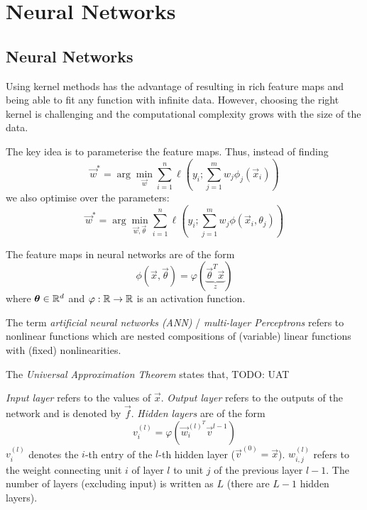\chapter{Neural Networks}


\section{Neural Networks}
Using kernel methods has the advantage of resulting in rich
feature maps and being able to fit any function with infinite data.
However, choosing the right kernel is challenging and the
computational complexity grows with the size of the data.

The key idea is to parameterise the feature maps.
Thus, instead of finding
\begin{equation*}
\vec{w}^* = \arg\min_{\vec{w}}{
	\sum_{i=1}^n{\ell\left(y_i; \sum_{j=1}^m{w_j \phi_j(\vec{x}_i)} \right)}
}
\end{equation*}
we also optimise over the parameters:
\begin{equation*}
\vec{w}^* = \arg\min_{\vec{w}, \vec{\theta}}{
	\sum_{i=1}^n{\ell\left(y_i; \sum_{j=1}^m{w_j \phi(\vec{x}_i, \theta_j)} \right)}
}
\end{equation*}

The feature maps in neural networks are of the form
\begin{equation*}
\phi(\vec{x}, \vec{\theta})
= \varphi(\underbrace{\vec{\theta}^T \vec{x}}_{z})
\end{equation*}
where $\boldsymbol{\theta} \in \mathbb{R}^d$ and
$\varphi : \mathbb{R} \to \mathbb{R}$ is an activation function.

The term \emph{artificial neural networks (ANN)} /
\emph{multi-layer Perceptrons} refers to nonlinear functions
which are nested compositions of (variable) linear functions
with (fixed) nonlinearities.

The \emph{Universal Approximation Theorem} states that,
TODO: UAT

\emph{Input layer} refers to the values of $\vec{x}$.
\emph{Output layer} refers to the outputs of the network
and is denoted by $\vec{f}$.
\emph{Hidden layers} are of the form
\begin{equation*}
v_i^{(l)} = \varphi(\vec{w}_i^{(l)^T} \vec{v}^{l-1})
\end{equation*}
$v_i^{(l)}$ denotes the $i$-th entry of the $l$-th hidden layer
($\vec{v}^{(0)} = \vec{x}$).
$w_{i,j}^{(l)}$ refers to the weight connecting unit
$i$ of layer $l$ to unit $j$ of the previous layer $l-1$.
The number of layers (excluding input) is written as
$L$ (there are $L - 1$ hidden layers).

